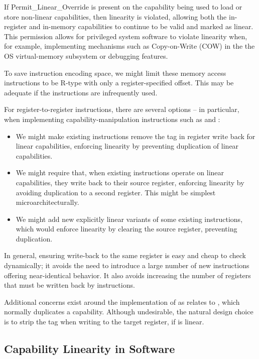 If Permit\_Linear\_Override is present on the capability being used to load or
store non-linear capabilities, then linearity is violated, allowing both the
in-register and in-memory capabilities to continue to be valid and marked as
linear.
This permission allows for privileged system software to violate linearity
when, for example, implementing mechanisms such as Copy-on-Write (COW) in the
the OS virtual-memory subsystem or debugging features.

To save instruction encoding space, we might limit these memory access
instructions to be R-type with only a register-specified offset.  This
may be adequate if the instructions are infrequently used.

For register-to-register instructions, there are several options -- in
particular, when implementing capability-manipulation instructions such as
 and :

\begin{itemize}
\item We might make existing instructions remove the tag in register write
  back for linear capabilities, enforcing linearity by preventing duplication
  of linear capabilities.

\item We might require that, when existing instructions operate on linear
  capabilities, they write back to their source register, enforcing linearity
  by avoiding duplication to a second register.  This might be
  simplest microarchitecturally.

\item We might add new explicitly linear variants of some existing
  instructions, which would enforce linearity by clearing the source register,
  preventing duplication.
\end{itemize}

In general, ensuring write-back to the same register is easy and cheap to
check dynamically; it avoids the need to introduce a large number of new
instructions offering near-identical behavior.
It also avoids increasing the number of registers that must be written back
by instructions.

Additional concerns exist around the implementation of \PCC{} as relates to
, which normally duplicates a capability.
Although undesirable, the natural design choice is to strip the tag when
writing to the target register, if \PCC{} is linear.

\subsection{Capability Linearity in Software}

